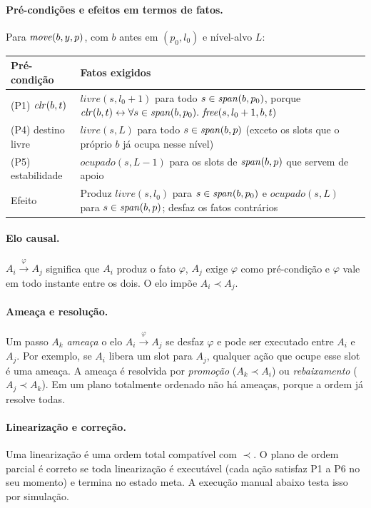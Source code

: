 \paragraph{Pré-condições e efeitos em termos de fatos.} Para $\mathit{move}(b,y,p)$, com $b$ antes em $(p_0,l_0)$ e nível-alvo $L$:
\begin{center}
\begin{tabular}{l p{9.2cm}}
\toprule
Pré-condição & Fatos exigidos \\
\midrule
(P1) $\mathit{clr}(b,t)$ & $\mathit{livre}(s,l_0+1)$ para todo $s\in\mathit{span}(b,p_0)$, porque $\mathit{clr}(b,t)\leftrightarrow\forall s\in\mathit{span}(b,p_0).\ \mathit{free}(s,l_0+1,b,t)$ \\
(P4) destino livre & $\mathit{livre}(s,L)$ para todo $s\in\mathit{span}(b,p)$ (exceto os slots que o próprio $b$ já ocupa nesse nível) \\
(P5) estabilidade & $\mathit{ocupado}(s,L-1)$ para os slots de $\mathit{span}(b,p)$ que servem de apoio \\
\midrule
Efeito & Produz $\mathit{livre}(s,l_0)$ para $s\in\mathit{span}(b,p_0)$ e $\mathit{ocupado}(s,L)$ para $s\in\mathit{span}(b,p)$; desfaz os fatos contrários \\
\bottomrule
\end{tabular}
\end{center}

\paragraph{Elo causal.} $A_i\xrightarrow{\varphi}A_j$ significa que $A_i$ produz o fato $\varphi$, $A_j$ exige $\varphi$ como pré-condição e $\varphi$ vale em todo instante entre os dois. O elo impõe $A_i\prec A_j$.

\paragraph{Ameaça e resolução.} Um passo $A_k$ \emph{ameaça} o elo $A_i\xrightarrow{\varphi}A_j$ se desfaz $\varphi$ e pode ser executado entre $A_i$ e $A_j$. Por exemplo, se $A_i$ libera um slot para $A_j$, qualquer ação que ocupe esse slot é uma ameaça. A ameaça é resolvida por \emph{promoção} ($A_k\prec A_i$) ou \emph{rebaixamento} ($A_j\prec A_k$). Em um plano totalmente ordenado não há ameaças, porque a ordem já resolve todas.

\paragraph{Linearização e correção.} Uma linearização é uma ordem total compatível com $\prec$. O plano de ordem parcial é correto se toda linearização é executável (cada ação satisfaz P1 a P6 no seu momento) e termina no estado meta. A execução manual abaixo testa isso por simulação.

